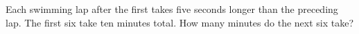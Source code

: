 Each swimming lap after the first takes five seconds longer than the preceding lap. The first six take ten minutes total. How many minutes do the next six take?
